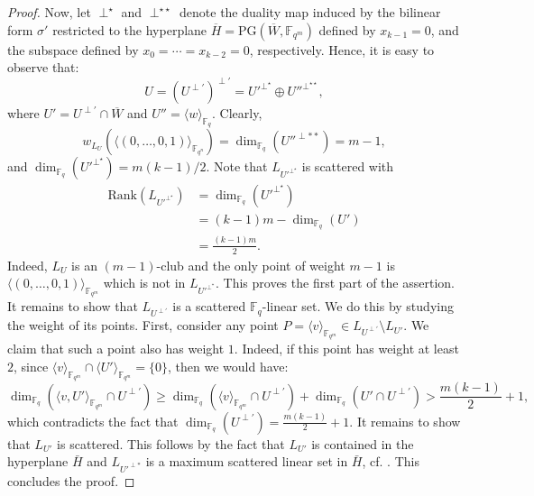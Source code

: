 \documentclass[11pt]{amsart}
\theoremstyle{definition}
\newcommand{\fqn}{\mathbb{F}_{q^n}}
\newcommand{\F}{{\mathbb F}}
\newcommand{\fq}{{\mathbb F}_{q}}
\newcommand{\la}{\langle}
\newcommand{\ra}{\rangle}
\newcommand{\fqm}{\mathbb{F}_{q^m}}
\begin{document}
\begin{proof}
Now, let \(\perp^\star\) and \(\perp^{\star\star}\) denote the duality map induced by the bilinear form $\sigma'$ restricted to the hyperplane \(\overline{H} = \mathrm{PG}(\overline{W}, \mathbb{F}_{q^m})\) defined by \(x_{k-1} = 0\), and the subspace defined by \(x_0 = \cdots = x_{k-2} = 0\), respectively.  Hence, it is easy to observe that:
\[
U = (U^{\perp'})^{\perp'} = U'^{\perp^\star} \oplus U''^{\perp^{\star\star}},
\]
where \(U' = U^{\perp'} \cap \overline{W}\) and \(U'' = \langle w \rangle_{\mathbb{F}_q}\).
Clearly, 
\[ w_{L_U}(\la (0,\ldots,0,1)\ra_{\fqn})=\dim_{\fq}(U''^{\perp**})=m-1, \]
and $\dim_{\fq}(U'^{\perp^\star})=m(k-1)/2$.
Note that $L_{U'^{\perp^\star}}$ is scattered with 
\[
\begin{array}{rl}
\mathrm{Rank}(L_{U'^{\perp^\star}}) & =\dim_{\F_q}\left(U'^{\perp^\star}\right) \\
& = (k-1)m-\dim_{\F_q}\left(U'\right) \\
& = \frac{(k-1)m}{2}.
\end{array}
\]
Indeed, $L_U$ is an $(m-1)$-club and the only point of weight $m-1$ is $\la(0,\ldots,0,1)\ra_{\fqm}$ which is not in $L_{U'^{\perp^\star}}$.
This proves the first part of the assertion. It remains to show that \(L_{U^{\perp'}}\) is a scattered $\F_q$-linear set. We do this by studying the weight of its points.
First, consider any point \(P = \langle v \rangle_{\mathbb{F}_{q^m}} \in L_{U^{\perp'}} \setminus L_{U'}\). We claim that such a point also has weight $1$. Indeed, if this point has weight at least $2$, since $\langle v \rangle_{\fqm} \cap \langle U' \rangle_{\fqm}=\{0\}$, then we would have:
\[
\dim_{\mathbb{F}_q}(\langle v, U' \rangle_{\mathbb{F}_{q^m}} \cap U^{\perp'}) \geq \dim_{\mathbb{F}_q}(\langle v \rangle_{\mathbb{F}_{q^m}} \cap U^{\perp'}) + \dim_{\mathbb{F}_q}(U' \cap U^{\perp'}) > \frac{m(k - 1)}{2} + 1,
\]
which contradicts the fact that \(\dim_{\mathbb{F}_q}(U^{\perp'}) = \frac{m(k - 1)}{2} + 1\). It remains to show that \(L_{U'}\) is scattered. This follows by the fact that $L_{U'}$ is contained in the hyperplane $\bar{H}$ and $L_{U'^{\perp*}}$ is a maximum scattered linear set in $\bar{H}$, cf. \cite[Theorem 3.5]{polverino2010linear}. This concludes the proof. 
\end{proof}
\end{document}
